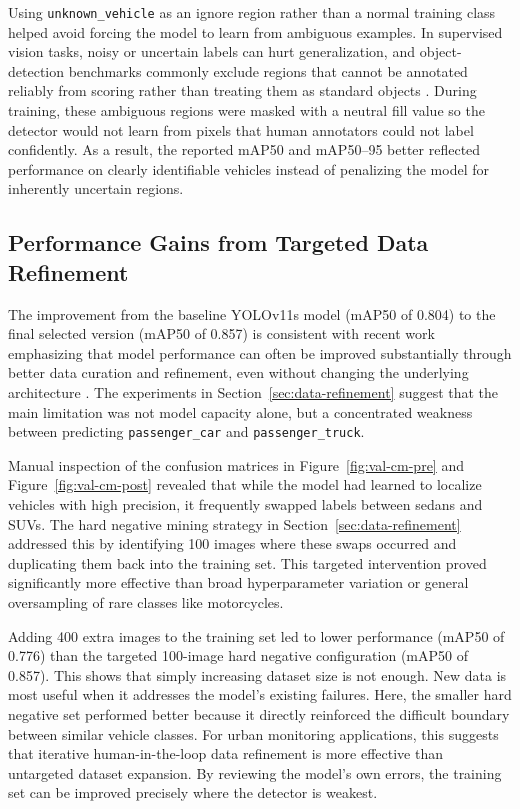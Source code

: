 Using \verb|unknown_vehicle| as an ignore region rather than a normal training class
helped avoid forcing the model to learn from ambiguous examples. In supervised vision
tasks, noisy or uncertain labels can hurt generalization, and object-detection 
benchmarks commonly exclude regions that cannot be annotated reliably from scoring 
rather than treating them as standard objects \cite{song2022learningnoisylabelsdeep}. 
During training, these ambiguous regions were masked with a neutral fill value so
the detector would not learn from pixels that human annotators could not label 
confidently. As a result, the reported mAP50 and mAP50--95 better reflected performance
on clearly identifiable vehicles instead of penalizing the model for inherently
uncertain regions.


\subsection{Performance Gains from Targeted Data Refinement}

The improvement from the baseline YOLOv11s model (mAP50 of 0.804) to the final selected 
version (mAP50 of 0.857) is consistent with recent work emphasizing that model performance
can often be improved substantially through better data curation and refinement, even 
without changing the underlying architecture \cite{feuer2024selectlargescalebenchmarkdata, goyal2024scalinglawsdatafiltering}. 
The experiments in Section~\ref{sec:data-refinement}
suggest that the main limitation was not model capacity alone, but a concentrated 
weakness between predicting \verb|passenger_car| and \verb|passenger_truck|.

Manual inspection of the confusion matrices in Figure~\ref{fig:val-cm-pre} and Figure~\ref{fig:val-cm-post}
revealed that while the model had learned to localize vehicles 
with high precision, it frequently swapped labels between sedans and SUVs.
The hard negative mining strategy in Section~\ref{sec:data-refinement} addressed this by identifying
100 images where these swaps occurred and duplicating them back into the training set.
This targeted intervention proved significantly more effective than broad hyperparameter
variation or general oversampling of rare classes like motorcycles.

Adding 400 extra images to the training set led to lower performance (mAP50 of 0.776) 
than the targeted 100-image hard negative configuration (mAP50 of 0.857). This shows 
that simply increasing dataset size is not enough. New data is most useful when it 
addresses the model’s existing failures. Here, the smaller hard negative set performed
better because it directly reinforced the difficult boundary between similar vehicle
classes. For urban monitoring applications, this suggests that iterative human-in-the-loop
data refinement is more effective than untargeted dataset expansion. By reviewing the 
model's own errors, the training set can be improved precisely where the detector 
is weakest.

